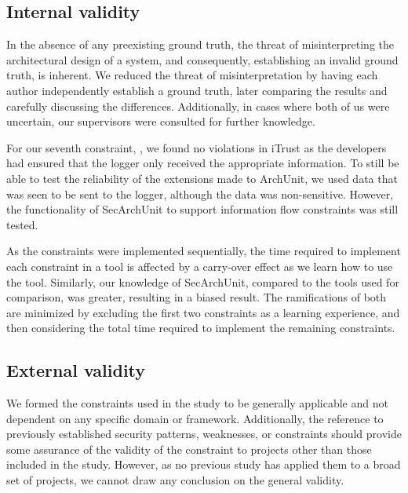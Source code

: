 \subsection{Internal validity}
In the absence of any preexisting ground truth, the threat of misinterpreting the architectural design of a system, and consequently, establishing an invalid ground truth, is inherent. We reduced the threat of misinterpretation by having each author independently establish a ground truth, later comparing the results and carefully discussing the differences. Additionally, in cases where both of us were uncertain, our supervisors were consulted for further knowledge.


For our seventh constraint, , we found no violations in iTrust as the developers had ensured that the logger only received the appropriate information. To still be able to test the reliability of the extensions made to ArchUnit, we used data that was seen to be sent to the logger, although the data was non-sensitive. However, the functionality of SecArchUnit to support information flow constraints was still tested. 

As the constraints were implemented sequentially, the time required to implement each constraint in a tool is affected by a carry-over effect as we learn how to use the tool. Similarly, our knowledge of SecArchUnit, compared to the tools used for comparison, was greater, resulting in a biased result. The ramifications of both are minimized by excluding the first two constraints as a learning experience, and then considering the total time required to implement the remaining constraints.

\subsection{External validity}

We formed the constraints used in the study to be generally applicable and not dependent on any specific domain or framework. Additionally, the reference to previously established security patterns, weaknesses, or constraints should provide some assurance of the validity of the constraint to projects other than those included in the study. However, as no previous study has applied them to a broad set of projects, we cannot draw any conclusion on the general validity. 

